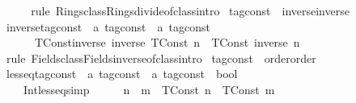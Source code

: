 \begin{isabellebody}
\isanewline
\ \ \isamarkupfalse%
%
\isadelimproof
\ %
\endisadelimproof
%
\isatagproof
{}\isamarkupfalse%
\ {\isacharparenleft}rule\ Rings{\isachardot}class{\isachardot}Rings{\isachardot}divide{\isachardot}of{\isacharunderscore}class{\isachardot}intro{\isacharparenright}%
\endisatagproof
{\isafoldproof}%
%
\isadelimproof
%
\endisadelimproof
\isanewline
{}\isamarkupfalse%
\isanewline
\isanewline
{}\isamarkupfalse%
\ tag{\isacharunderscore}const\ {\isacharcolon}{\isacharcolon}\ {\isacharparenleft}inverse{\isacharparenright}inverse\isanewline
{}\isanewline
\ \ \isamarkupfalse%
\ inverse{\isacharunderscore}tag{\isacharunderscore}const\ {\isacharcolon}{\isacharcolon}\ {\isacartoucheopen}{\isacharprime}a\ tag{\isacharunderscore}const\ {\isasymRightarrow}\ {\isacharprime}a\ tag{\isacharunderscore}const{\isacartoucheclose}\isanewline
\ \ \isanewline
\ \ \ \ \ \ TConst{\isacharunderscore}inverse{\isacharcolon}\ {\isacartoucheopen}inverse\ {\isacharparenleft}TConst\ n{\isacharparenright}\ {\isacharequal}\ {\isacharparenleft}TConst\ {\isacharparenleft}inverse\ n{\isacharparenright}{\isacharparenright}{\isacartoucheclose}\isanewline
\isanewline
\ \ \isamarkupfalse%
%
\isadelimproof
\ %
\endisadelimproof
%
\isatagproof
{}\isamarkupfalse%
\ {\isacharparenleft}rule\ Fields{\isachardot}class{\isachardot}Fields{\isachardot}inverse{\isachardot}of{\isacharunderscore}class{\isachardot}intro{\isacharparenright}%
\endisatagproof
{\isafoldproof}%
%
\isadelimproof
%
\endisadelimproof
\isanewline
{}\isamarkupfalse%
\isanewline
\isanewline
{}\isamarkupfalse%
\ tag{\isacharunderscore}const\ {\isacharcolon}{\isacharcolon}\ {\isacharparenleft}order{\isacharparenright}order\isanewline
{}\isanewline
\ \ \isamarkupfalse%
\ less{\isacharunderscore}eq{\isacharunderscore}tag{\isacharunderscore}const\ {\isacharcolon}{\isacharcolon}\ {\isacartoucheopen}{\isacharprime}a\ tag{\isacharunderscore}const\ {\isasymRightarrow}\ {\isacharprime}a\ tag{\isacharunderscore}const\ {\isasymRightarrow}\ bool{\isacartoucheclose}\isanewline
\ \ \isanewline
\ \ \ \ Int{\isacharunderscore}less{\isacharunderscore}eq{\isacharbrackleft}simp{\isacharbrackright}{\isacharcolon}\ \ \ \ \ \ {\isacartoucheopen}n\ {\isasymle}\ m\ {\isasymLongrightarrow}\ {\isacharparenleft}TConst\ n{\isacharparenright}\ {\isasymle}\ {\isacharparenleft}TConst\ m{\isacharparenright}{\isacartoucheclose}\isanewline

\end{isabellebody}

